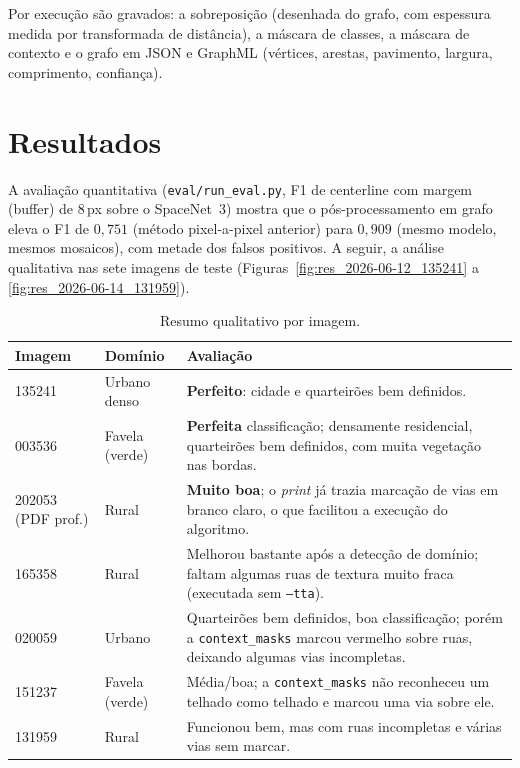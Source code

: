 \documentclass[12pt]{article}
\begin{document}
Por execução são gravados: a sobreposição (desenhada do grafo, com espessura
medida por transformada de distância), a máscara de classes, a máscara de
contexto e o grafo em JSON e GraphML (vértices, arestas, pavimento,
largura, comprimento, confiança).

\section{Resultados}

A avaliação quantitativa (\texttt{eval/run\_eval.py}, F1 de centerline com
margem (buffer) de 8\,px sobre o SpaceNet~3) mostra que o pós-processamento em
grafo eleva o F1 de $0{,}751$ (método pixel-a-pixel anterior) para
$0{,}909$ (mesmo modelo, mesmos mosaicos), com metade dos falsos
positivos. A seguir, a análise qualitativa nas sete imagens de teste
(Figuras~\ref{fig:res_2026-06-12_135241} a \ref{fig:res_2026-06-14_131959}).

\begin{table}[H]
\centering
\caption{Resumo qualitativo por imagem.}
\label{tab:resumo}
\footnotesize
\begin{tabular}{@{}p{3.2cm}p{2.0cm}p{8.5cm}@{}}
\toprule
\textbf{Imagem} & \textbf{Domínio} & \textbf{Avaliação} \\ \midrule
135241 & Urbano denso & \textbf{Perfeito}: cidade e quarteirões bem definidos. \\
003536 & Favela (verde) & \textbf{Perfeita} classificação; densamente residencial, quarteirões bem definidos, com muita vegetação nas bordas. \\
202053 (PDF prof.) & Rural & \textbf{Muito boa}; o \textit{print} já trazia marcação de vias em branco claro, o que facilitou a execução do algoritmo. \\
165358 & Rural & Melhorou bastante após a detecção de domínio; faltam algumas ruas de textura muito fraca (executada sem \texttt{--tta}). \\
020059 & Urbano & Quarteirões bem definidos, boa classificação; porém a \texttt{context\_masks} marcou vermelho sobre ruas, deixando algumas vias incompletas. \\
151237 & Favela (verde) & Média/boa; a \texttt{context\_masks} não reconheceu um telhado como telhado e marcou uma via sobre ele. \\
131959 & Rural & Funcionou bem, mas com ruas incompletas e várias vias sem marcar. \\ \bottomrule
\end{tabular}
\end{table}
\end{document}

